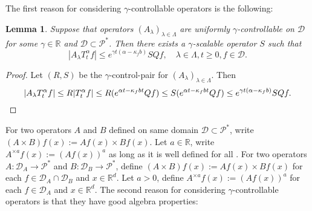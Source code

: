 \documentclass[12pt,oneside,english]{amsart}
\theoremstyle{plain}
\newtheorem{lem}[thm]{Lemma}
\theoremstyle{definition}
\numberwithin{equation}{section}
\newcommand{\added}[1]{{\color{blue}#1}}\newcommand{\deleted}[1]{{\color{red}#1}}
\begin{document}
    The first reason for considering $\gamma$-controllable operators is the following:
\added{
\begin{lem}
    Suppose that operators $(A_\lambda)_{\lambda\in \Lambda}$ are uniformly $\gamma$-controllable on $\mathcal D$ for some $\gamma \in \mathbb R$ and $\mathcal D \subset \mathcal P^*$.
    Then there exists a $\gamma$-scalable operator $S$ such that
\[
    |A_\lambda T_t^\alpha f|
    \leq e^{\gamma t (\alpha  - \kappa_f b)} SQf,
    \quad \lambda \in \Lambda, t\geq 0, f\in \mathcal D.
\]
\end{lem}
}
\added{
\begin{proof}
    Let $(R,S)$ be the $\gamma$-control-pair for $(A_\lambda)_{\lambda\in \Lambda}$.
    Then
\[
    |A_\lambda T_t^\alpha f| \leq R|T_t^\alpha f|
    \leq R (e^{\alpha t  - \kappa_f bt}Qf)
    \leq S (e^{\alpha t  - \kappa_f bt}Qf)
    \leq e^{\gamma t (\alpha  - \kappa_f b)} SQf.
    \qedhere
\]
\end{proof}
}
\deleted{
    For two operators $A$ and $B$ defined on same domain $\mathcal D\subset \mathcal P^*$, write $(A\times B)f (x):= Af(x) \times Bf(x)$.
    Let $a \in \mathbb R$, write $A^{\times a}f(x):= (Af(x))^a$ as long as it is well defined for all .
}
\added{
	For two operators $A: \mathcal D_A \to \mathcal P^*$ and $B: \mathcal D_B \to \mathcal P^*$, define $(A\times B)f (x):= Af(x) \times Bf(x)$ for each $f\in \mathcal D_A \cap \mathcal D_B$ and $x\in \mathbb R^d$.
    Let $a > 0$, define $A^{\times a}f(x):= (Af(x))^a$ for each $f\in \mathcal D_A$ and $x\in \mathbb R^d$.
}
    The second reason for considering $\gamma$-controllable operators is that they have good algebra properties:
\end{document}
